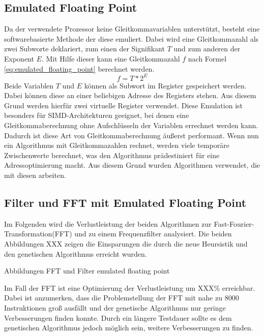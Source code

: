 \subsection{Emulated Floating Point}
\label{chap:emulated_floating_point}
Da der verwendete Prozessor keine Gleitkommavariablen unterstützt, besteht eine softwarebasierte Methode der diese emuliert. Dabei wird eine Gleitkommazahl als zwei Subworte deklariert, zum einen der Signifikant $T$ und zum anderen der Exponent $E$. Mit Hilfe dieser kann eine Gleitkommazahl $f$ nach Formel \ref{eq:emulated_floating_point} berechnet werden.
\begin{equation}
f = T *2^E
\label{eq:emulated_floating_point}
\end{equation}
Beide Variablen $T$ und $E$ können als Subwort im Register gespeichert werden. Dabei können diese an einer beliebigen Adresse des Registers stehen. Aus diesem Grund werden hierfür zwei virtuelle Register verwendet. Diese Emulation ist besonders für SIMD-Architekturen geeignet, bei denen eine Gleitkommaberechnung ohne Aufschlüsseln der Variablen errechnet werden kann. Dadurch ist diese Art von Gleitkommaberechnung äußerst performant.
Wenn nun ein Algorithmus mit Gleitkommazahlen rechnet, werden viele temporäre Zwischenwerte berechnet, was den Algorithmus prädestiniert für eine Adressoptimierung macht. Aus diesem Grund wurden  Algorithmen verwendet, die mit diesen arbeiten. \cite{gerlach2016efficient}

\subsection{Filter und FFT mit Emulated Floating Point}
Im Folgenden wird die Verlustleistung der beiden Algorithmen zur \glqq Fast-Fourier-Transformation\grqq{ }(FFT) und zu einem Frequenzfilter analysiert. Die beiden Abbildungen XXX zeigen die Einsparungen die durch die neue Heursistik und den genetischen Algorithmus erreicht wurden.

Abbildungen FFT und Filter emulated floating point

Im Fall der FFT ist eine Optimierung der Verlustleistung um XXX\% erreichbar. Dabei ist anzumerken, dass die Problemstellung der FFT mit nahe zu 8000 Instruktionen groß ausfällt und der genetische Algorithmus nur geringe Verbesserungen finden konnte. Durch ein längere Testdauer sollte es dem genetischen Algorithmus jedoch möglich sein, weitere Verbesserungen zu finden.




